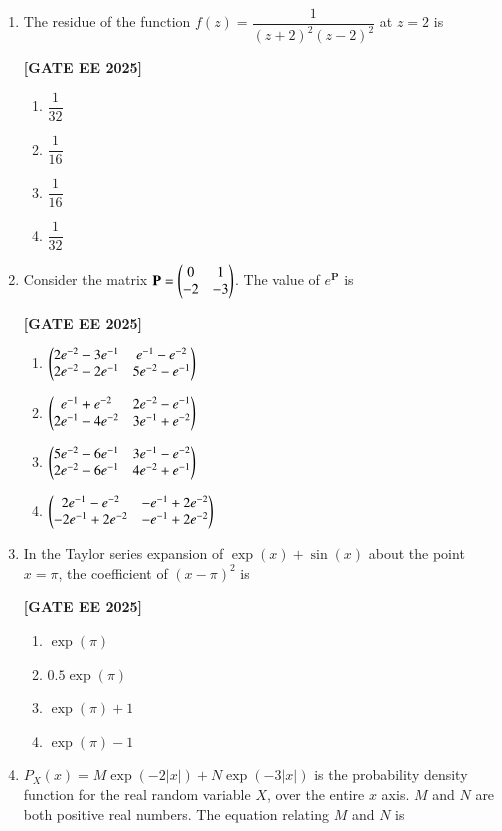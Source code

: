 \documentclass[12pt]{article}
\begin{document}
\begin{enumerate}[leftmargin=*, label=\textbf{Q.\arabic*:}]
\item The residue of the function $f(z) = \dfrac{1}{(z+2)^2 (z-2)^2}$ at $z = 2$ is
 
\noindent \textbf{[GATE EE 2025]}
\begin{enumerate}
    \item $\dfrac{1}{32}$
    \item $\dfrac{1}{16}$
    \item $\dfrac{1}{16}$
    \item $\dfrac{1}{32}$
\end{enumerate}

\item Consider the matrix $\mathbf{P} = \begin{pmatrix} 0 & 1 \\ -2 & -3 \end{pmatrix}$. The value of $e^{\mathbf{P}}$ is
 
\noindent \textbf{[GATE EE 2025]}
\begin{enumerate}
    \item $\begin{pmatrix} 2e^{-2} - 3e^{-1} & e^{-1} - e^{-2} \\ 2e^{-2} - 2e^{-1} & 5e^{-2} - e^{-1}\end{pmatrix}$
    \item $\begin{pmatrix} e^{-1} + e^{-2} & 2e^{-2} - e^{-1} \\ 2e^{-1} - 4e^{-2} & 3e^{-1} + e^{-2} \end{pmatrix}$
    \item $\begin{pmatrix} 5e^{-2} - 6e^{-1} & 3e^{-1} - e^{-2} \\ 2e^{-2} - 6e^{-1} & 4e^{-2} + e^{-1} \end{pmatrix}$
    \item $\begin{pmatrix} 2e^{-1} - e^{-2} & -e^{-1} + 2e^{-2} \\ -2e^{-1} + 2e^{-2} & -e^{-1} + 2e^{-2} \end{pmatrix}$
\end{enumerate}

\item In the Taylor series expansion of $\exp(x) + \sin(x)$ about the point $x = \pi$, the coefficient of $(x - \pi)^2$ is
 
\noindent \textbf{[GATE EE 2025]}
\begin{enumerate}
    \item $\exp(\pi)$
    \item $0.5 \exp(\pi)$
    \item $\exp(\pi) + 1$
    \item $\exp(\pi) - 1$
\end{enumerate}

\item $P_X(x) = M\exp(-2|x|) + N\exp(-3|x|)$ is the probability density function for the real random variable $X$, over the entire $x$ axis. $M$ and $N$ are both positive real numbers. The equation relating $M$ and $N$ is
 

\end{enumerate}
\end{document}
